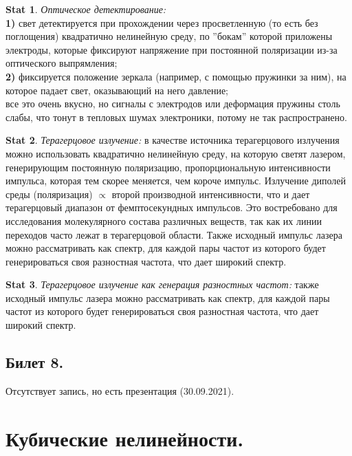 \documentclass[a4paper,12pt]{article}
\theoremstyle{definition} %
\newtheorem{Stat}{Stat}[section]
\theoremstyle{definition} %
\theoremstyle{remark} %
\begin{document}
\begin{Stat}\label{stat \theStat}
	\textit{Оптическое детектирование:} \\
	\textbf{1)} свет детектируется при прохождении через просветленную (то есть без поглощения) квадратично нелинейную среду, по ''бокам'' которой приложены электроды, которые фиксируют напряжение при постоянной поляризации из-за оптического выпрямления; \\
	\textbf{2)} фиксируется положение зеркала (например, с помощью пружинки за ним), на которое падает свет, оказывающий на него давление; \\
	все это очень вкусно, но сигналы с электродов или деформация пружины столь слабы, что тонут в тепловых шумах электроники, потому не так распространено.
\end{Stat}
\begin{Stat}\label{stat \theStat}
	\textit{Терагерцовое излучение:} в качестве источника терагерцового излучения можно использовать квадратично нелинейную среду, на которую светят лазером, генерирующим постоянную поляризацию, пропорциональную интенсивности импульса, которая тем скорее меняется, чем короче импульс. Излучение диполей среды (поляризация) $\propto$ второй производной интенсивности, что и дает терагерцовый диапазон от фемптосекундных импульсов. Это востребовано для исследования молекулярного состава различных веществ, так как их линии переходов часто лежат в терагерцовой области. Также исходный импульс лазера можно рассматривать как спектр, для каждой пары частот из которого будет генерироваться своя разностная частота, что дает широкий спектр.
\end{Stat}
\begin{Stat}\label{stat \theStat}
	\textit{Терагерцовое излучение как генерация разностных частот:} также исходный импульс лазера можно рассматривать как спектр, для каждой пары частот из которого будет генерироваться своя разностная частота, что дает широкий спектр.
\end{Stat}

\subsection{Билет 8.}

Отсутствует запись, но есть презентация (30.09.2021).

\section{Кубические нелинейности.}
\end{document}
